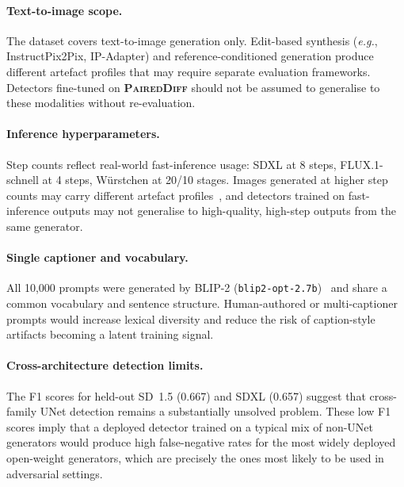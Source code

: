 \documentclass[journal]{IEEEtran}
\newcommand{\datasetname}{\textsc{PairedDiff}}
\newcommand{\eg}{\textit{e.g.}}
\begin{document}
\paragraph{Text-to-image scope.}
The dataset covers text-to-image generation only.
Edit-based synthesis (\eg, InstructPix2Pix, IP-Adapter) and
reference-conditioned generation produce different artefact
profiles that may require separate evaluation frameworks.
Detectors fine-tuned on \textbf{\datasetname} should not be assumed
to generalise to these modalities without re-evaluation.

\paragraph{Inference hyperparameters.}
Step counts reflect real-world fast-inference usage: SDXL at 8
steps, FLUX.1-schnell at 4 steps, W\"{u}rstchen at 20/10 stages.
Images generated at higher step counts may carry different
artefact profiles~\cite{corvi2023detection}, and detectors trained
on fast-inference outputs may not generalise to high-quality,
high-step outputs from the same generator.

\paragraph{Single captioner and vocabulary.}
All 10{,}000 prompts were generated by BLIP-2
(\texttt{blip2-opt-2.7b})~\cite{li2023blip2} and share a common
vocabulary and sentence structure.
Human-authored or multi-captioner prompts would increase lexical
diversity and reduce the risk of caption-style artifacts becoming
a latent training signal.

\paragraph{Cross-architecture detection limits.}
The F1 scores for held-out SD~1.5 (0.667) and SDXL (0.657) suggest
that cross-family UNet detection remains a substantially unsolved
problem.
These low F1 scores imply that a deployed detector trained on a
typical mix of non-UNet generators would produce high false-negative
rates for the most widely deployed open-weight generators, which are
precisely the ones most likely to be used in adversarial settings.



\end{document}
